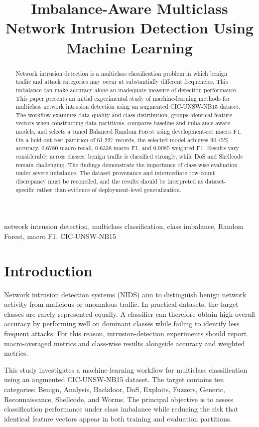 \documentclass[conference]{IEEEtran}
\title{Imbalance-Aware Multiclass Network Intrusion Detection Using Machine Learning}
\author{
\IEEEauthorblockN{Ali Kaisar Saiful}
\IEEEauthorblockA{
Department of Computer Science and Engineering\\
State University of Bangladesh\\
Bangladesh
}
}
\begin{document}
\maketitle

\begin{abstract}
Network intrusion detection is a multiclass classification problem in which benign traffic and attack categories may occur at substantially different frequencies. This imbalance can make accuracy alone an inadequate measure of detection performance. This paper presents an initial experimental study of machine-learning methods for multiclass network intrusion detection using an augmented CIC-UNSW-NB15 dataset. The workflow examines data quality and class distribution, groups identical feature vectors when constructing data partitions, compares baseline and imbalance-aware models, and selects a tuned Balanced Random Forest using development-set macro F1. On a held-out test partition of 61,227 records, the selected model achieves 90.45\% accuracy, 0.6780 macro recall, 0.6338 macro F1, and 0.9085 weighted F1. Results vary considerably across classes: benign traffic is classified strongly, while DoS and Shellcode remain challenging. The findings demonstrate the importance of class-wise evaluation under severe imbalance. The dataset provenance and intermediate row-count discrepancy must be reconciled, and the results should be interpreted as dataset-specific rather than evidence of deployment-level generalization.
\end{abstract}

\begin{IEEEkeywords}
network intrusion detection, multiclass classification, class imbalance, Random Forest, macro F1, CIC-UNSW-NB15
\end{IEEEkeywords}

\section{Introduction}
Network intrusion detection systems (NIDS) aim to distinguish benign network activity from malicious or anomalous traffic. In practical datasets, the target classes are rarely represented equally. A classifier can therefore obtain high overall accuracy by performing well on dominant classes while failing to identify less frequent attacks. For this reason, intrusion-detection experiments should report macro-averaged metrics and class-wise results alongside accuracy and weighted metrics.

This study investigates a machine-learning workflow for multiclass classification using an augmented CIC-UNSW-NB15 dataset. The target contains ten categories: Benign, Analysis, Backdoor, DoS, Exploits, Fuzzers, Generic, Reconnaissance, Shellcode, and Worms. The principal objective is to assess classification performance under class imbalance while reducing the risk that identical feature vectors appear in both training and evaluation partitions.
\end{document}
